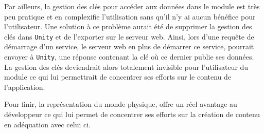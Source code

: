 Par ailleurs, la gestion des clés pour accéder aux données dans le module est très peu pratique et en complexifie l'utilisation sans qu'il n'y ai aucun bénéfice pour l'utilisateur. Une solution à ce problème aurait été de supprimer la gestion des clés dans \texttt{Unity} et de l'exporter sur le serveur web. Ainsi, lors d'une requête de démarrage d'un service, le serveur web en plus de démarrer ce service, pourrait envoyer à \texttt{Unity}, une réponse contenant la clé où ce dernier publie ses données. La gestion des clés deviendrait alors totalement invisible pour l'utilisateur du module ce qui lui permettrait de concentrer ses efforts sur le contenu de l'application.

Pour finir, la représentation du monde physique, offre un réel avantage au développeur ce qui lui permet de concentrer ses efforts sur la création de contenu en adéquation avec celui ci.